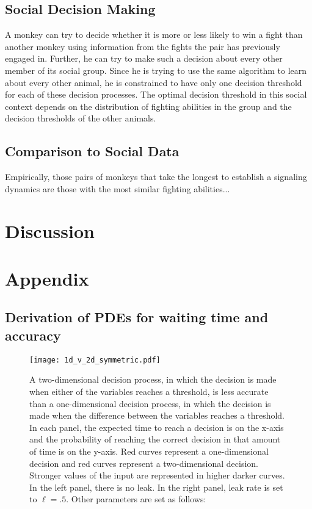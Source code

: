 \documentclass{article}
\begin{document}
\subsection{Social Decision Making }
A monkey can try to decide whether it is more or less likely to win a fight than another monkey using information from the fights the pair has previously engaged in.  Further, he can try to make such a decision about every other member of its social group.  Since he is trying to use the same algorithm to learn about every other animal, he is constrained to have only one decision threshold for each of these decision processes.  The optimal decision threshold in this social context depends on the distribution of fighting abilities in the group and the decision thresholds of the other animals. 

\subsection{Comparison to Social Data }
Empirically, those pairs of monkeys that take the longest to establish a signaling dynamics are those with the most similar fighting abilities...

\section{Discussion}


\section{Appendix}

\subsection{Derivation of PDEs for waiting time and accuracy \label{pdes_deriv}}

\begin{figure}
\texttt{[image: 1d\_v\_2d\_symmetric.pdf]}
\caption{\label{1dv2d} A two-dimensional decision process, in which the decision is made when either of the variables reaches a threshold, is less accurate than a one-dimensional decision process, in which the decision is made when the difference between the variables reaches a threshold.  In each panel, the expected time to reach a decision is on the x-axis and the probability of reaching the correct decision in that amount of time is on the y-axis.  Red curves represent a one-dimensional decision and red curves represent a two-dimensional decision.  Stronger values of the input are represented in higher darker curves.  In the left panel, there is no leak.  In the right panel, leak rate is set to $\ell=.5$.  Other parameters are set as follows:}
\end{figure}
\end{document}
